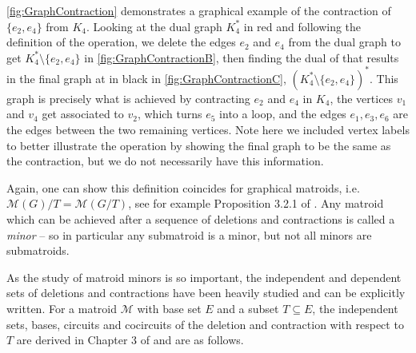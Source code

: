 \documentclass[12pt]{report}
\theoremstyle{definition}
\def\calM{\mathcal M}
\theoremstyle{upright}
\begin{document}
\cref{fig:GraphContraction} demonstrates a graphical example of the contraction of $\{e_2, e_4\}$ from $K_4$.
Looking at the dual graph $K_4^*$ in red and following the definition of the operation, we delete the edges $e_2$ and $e_4$ from the dual graph to get $K_4^*\setminus\{e_2, e_4\}$ in \cref{fig:GraphContractionB}, then finding the dual of that results in the final graph at in black in \cref{fig:GraphContractionC}, $(K_4^*\setminus\{e_2, e_4\})^*$.
This graph is precisely what is achieved by contracting $e_2$ and $e_4$ in $K_4$, the vertices $v_1$ and $v_4$ get associated to $v_2$, which turns $e_5$ into a loop, and the edges $e_1, e_3, e_6$ are the edges between the two remaining vertices.
Note here we included vertex labels to better illustrate the operation by showing the final graph to be the same as the contraction, but we do not necessarily have this information.

Again, one can show this definition coincides for graphical matroids, i.e. $\calM(G)/T=\calM(G/T)$, see for example Proposition 3.2.1 of \cite{oxley2006matroid}.
Any matroid which can be achieved after a sequence of deletions and contractions is called a \textit{minor} -- so in particular any submatroid is a minor, but not all minors are submatroids.

As the study of matroid minors is so important, the independent and dependent sets of deletions and contractions have been heavily studied and can be explicitly written.
For a matroid $\calM$ with base set $E$ and a subset $T\subseteq E$, the independent sets, bases, circuits and cocircuits of the deletion and contraction with respect to $T$ are derived in Chapter 3 of \cite{oxley2006matroid} and are as follows.
\end{document}
